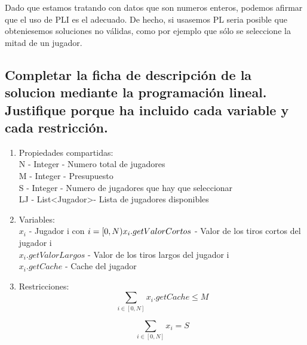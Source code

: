 \documentclass[a4paper,11pt]{article}
\begin{document}
Dado que estamos tratando con datos que son numeros enteros, podemos afirmar que el uso de PLI es el adecuado. De hecho, si usasemos PL seria posible que obteniesemos soluciones no válidas, como por ejemplo que sólo se seleccione la mitad de un jugador.

\subsection{Completar la ficha de descripción de la solucion mediante la programación lineal. Justifique porque ha incluido cada variable y cada restricción.}

\begin{enumerate}
\item Propiedades compartidas:\\
N - Integer - Numero total de jugadores\\
M - Integer - Presupuesto\\
S - Integer - Numero de jugadores que hay que seleccionar\\
LJ - List\textless Jugador\textgreater - Lista de jugadores disponibles\\
\item Variables:\\
\begin{math}
 x_i
\end{math}
- Jugador i con \begin{math}
                 i = [0,N)\\
x_i.getValorCortos
\end{math}
- Valor de los tiros cortos del jugador i\\
\begin{math}
x_i.getValorLargos
\end{math}
- Valor de los tiros largos del jugador i\\
 \begin{math}
 x_i.getCache
 \end{math}
 - Cache del jugador\\

\item Restricciones:\\
\setcounter{equation}{0}
\begin{equation}
 \sum_{i \in [0,N]}{x_i .getCache} \leq M
\end{equation}

 \begin{equation}
 \sum_{i \in [0,N]}{x_i} = S
\end{equation}


\end{enumerate}
\end{document}
